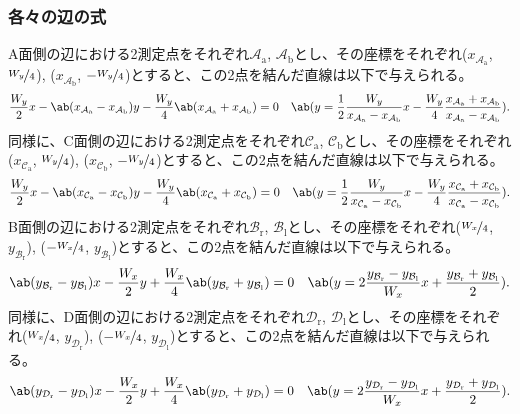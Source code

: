 \subsubsection{各々の辺の式}
A面側の辺における2測定点をそれぞれ$\mathcal A_\mathrm a$, $\mathcal A_\mathrm b$とし、その座標をそれぞれ($x_{\mathcal A_\mathrm a}$, $\nicefrac{W_y}4$), ($x_{\mathcal A_\mathrm b}$, $-\nicefrac{W_y}4$)とすると、この2点を結んだ直線は以下で与えられる。
\begin{align*}
  \frac{W_y}2x
  -\ab(x_{\mathcal A_\mathrm a}-x_{\mathcal A_\mathrm b})y
  -\frac{W_y}4\ab(x_{\mathcal A_\mathrm a}+x_{\mathcal A_\mathrm b})
  = 0\quad
  \ab(
    y = \frac12\frac{W_y}{x_{\mathcal A_\mathrm a}-x_{\mathcal A_\mathrm b}}x
        -\frac{W_y}4\frac{x_{\mathcal A_\mathrm a}+x_{\mathcal A_\mathrm b}}
                         {x_{\mathcal A_\mathrm a}-x_{\mathcal A_\mathrm b}}
  ).
\end{align*}
同様に、C面側の辺における2測定点をそれぞれ$\mathcal C_\mathrm a$, $\mathcal C_\mathrm b$とし、その座標をそれぞれ($x_{\mathcal C_\mathrm a}$, $\nicefrac{W_y}4$), ($x_{\mathcal C_\mathrm b}$, $-\nicefrac{W_y}4$)とすると、この2点を結んだ直線は以下で与えられる。
\begin{align*}
  \frac{W_y}2x
  -\ab(x_{\mathcal C_\mathrm a}-x_{\mathcal C_\mathrm b})y
  -\frac{W_y}4\ab(x_{\mathcal C_\mathrm a}+x_{\mathcal C_\mathrm b})
  = 0\quad
  \ab(
    y = \frac12\frac{W_y}{x_{\mathcal C_\mathrm a}-x_{\mathcal C_\mathrm b}}x
        -\frac{W_y}4\frac{x_{\mathcal C_\mathrm a}+x_{\mathcal C_\mathrm b}}
                         {x_{\mathcal C_\mathrm a}-x_{\mathcal C_\mathrm b}}
  ).
\end{align*}
B面側の辺における2測定点をそれぞれ$\mathcal B_\mathrm r$, $\mathcal B_\mathrm l$とし、その座標をそれぞれ($\nicefrac{W_x}4$, $y_{\mathcal B_\mathrm r}$), ($-\nicefrac{W_x}4$, $y_{\mathcal B_\mathrm l}$)とすると、この2点を結んだ直線は以下で与えられる。
\begin{align*}
  \ab(y_{\mathcal B_\mathrm r}-y_{\mathcal B_\mathrm l})x
  -\frac{W_x}2y
  +\frac{W_x}4\ab(y_{\mathcal B_\mathrm r}+y_{\mathcal B_\mathrm l})
  = 0\quad
  \ab(
    y = 2\frac{y_{\mathcal B_\mathrm r}-y_{\mathcal B_\mathrm l}}{W_x}x
        +\frac{y_{\mathcal B_\mathrm r}+y_{\mathcal B_\mathrm l}}2
  ).
\end{align*}
同様に、D面側の辺における2測定点をそれぞれ$\mathcal D_\mathrm r$, $\mathcal D_\mathrm l$とし、その座標をそれぞれ($\nicefrac{W_x}4$, $y_{\mathcal D_\mathrm r}$), ($-\nicefrac{W_x}4$, $y_{\mathcal D_\mathrm l}$)とすると、この2点を結んだ直線は以下で与えられる。
\begin{align*}
  \ab(y_{\mathcal D_\mathrm r}-y_{\mathcal D_\mathrm l})x
  -\frac{W_x}2y
  +\frac{W_x}4\ab(y_{\mathcal D_\mathrm r}+y_{\mathcal D_\mathrm l})
  = 0\quad
  \ab(
    y = 2\frac{y_{\mathcal D_\mathrm r}-y_{\mathcal D_\mathrm l}}{W_x}x
        +\frac{y_{\mathcal D_\mathrm r}+y_{\mathcal D_\mathrm l}}2
  ).
\end{align*}


